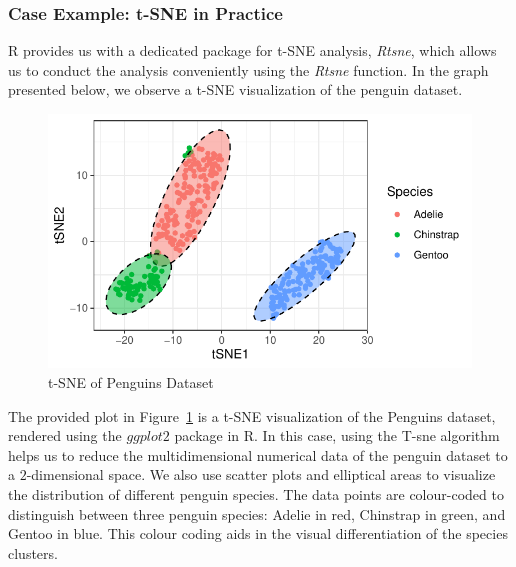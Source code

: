 \documentclass{article}\usepackage[]{graphicx}\usepackage[]{xcolor}
\makeatletter
\def\maxwidth{ %
  \ifdim\Gin@nat@width>\linewidth
    \linewidth
  \else
    \Gin@nat@width
  \fi
}
\newenvironment{knitrout}{}{} %
\numberwithin{equation}{section}
\makeatother
\begin{document}
\subsubsection{Case Example: t-SNE in Practice}

R provides us with a dedicated package for t-SNE analysis, \textit{Rtsne}, which allows us to conduct the analysis conveniently using the \textit{Rtsne} function. In the graph presented below, we observe a t-SNE visualization of the penguin dataset.\\

\begin{knitrout}\scriptsize
{}\color{fgcolor}\begin{figure}[H]

{\centering \includegraphics[width=\maxwidth]{figure/beamer-t-SNE-1} 

}

\caption[t-SNE of Penguins Dataset]{t-SNE of Penguins Dataset}\label{fig:t-SNE}
\end{figure}

\end{knitrout}

\noindent
The provided plot in Figure~\ref{fig:t-SNE} is a t-SNE visualization of the Penguins dataset, rendered using the $ggplot2$ package in R. In this case, using the T-sne algorithm helps us to reduce the multidimensional numerical data of the penguin dataset to a $2$-dimensional space. We also use scatter plots and elliptical areas to visualize the distribution of different penguin species. The data points are colour-coded to distinguish between three penguin species: Adelie in red, Chinstrap in green, and Gentoo in blue. This colour coding aids in the visual differentiation of the species clusters.\\
\end{document}

